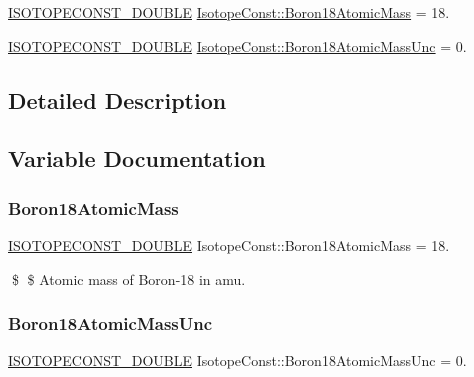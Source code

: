 \begin{DoxyCompactItemize}
\item 
\mbox{\hyperlink{group___isotope_const-_macros_ga8f45a7272ce02c0b4c65c44636ed719a}{I\+S\+O\+T\+O\+P\+E\+C\+O\+N\+S\+T\+\_\+\+D\+O\+U\+B\+LE}} \mbox{\hyperlink{group___isotope_const-_boron-_b18_gabb61265aec0438268ff624b75faac4cd}{Isotope\+Const\+::\+Boron18\+Atomic\+Mass}} = 18.
\item 
\mbox{\hyperlink{group___isotope_const-_macros_ga8f45a7272ce02c0b4c65c44636ed719a}{I\+S\+O\+T\+O\+P\+E\+C\+O\+N\+S\+T\+\_\+\+D\+O\+U\+B\+LE}} \mbox{\hyperlink{group___isotope_const-_boron-_b18_gaa5ade810e6917cf485c229bc1c21e116}{Isotope\+Const\+::\+Boron18\+Atomic\+Mass\+Unc}} = 0.
\end{DoxyCompactItemize}


\subsection{Detailed Description}


\subsection{Variable Documentation}
\mbox{\label{group___isotope_const-_boron-_b18_gabb61265aec0438268ff624b75faac4cd}} 
\subsubsection{\texorpdfstring{Boron18\+Atomic\+Mass}{Boron18AtomicMass}}
{\footnotesize\ttfamily \mbox{\hyperlink{group___isotope_const-_macros_ga8f45a7272ce02c0b4c65c44636ed719a}{I\+S\+O\+T\+O\+P\+E\+C\+O\+N\+S\+T\+\_\+\+D\+O\+U\+B\+LE}} Isotope\+Const\+::\+Boron18\+Atomic\+Mass = 18.}

\$ \$ Atomic mass of Boron-\/18 in amu. \mbox{\label{group___isotope_const-_boron-_b18_gaa5ade810e6917cf485c229bc1c21e116}} 
\subsubsection{\texorpdfstring{Boron18\+Atomic\+Mass\+Unc}{Boron18AtomicMassUnc}}
{\footnotesize\ttfamily \mbox{\hyperlink{group___isotope_const-_macros_ga8f45a7272ce02c0b4c65c44636ed719a}{I\+S\+O\+T\+O\+P\+E\+C\+O\+N\+S\+T\+\_\+\+D\+O\+U\+B\+LE}} Isotope\+Const\+::\+Boron18\+Atomic\+Mass\+Unc = 0.}

